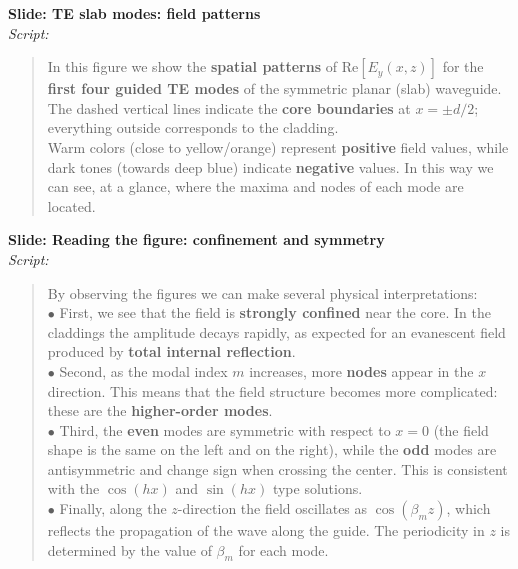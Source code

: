 \documentclass{article}
\begin{document}
\vspace{0.4cm}

\noindent
\textbf{Slide: TE slab modes: field patterns}\\[2mm]
\textit{Script:}\\[2mm]

\begin{quote}
In this figure we show the \textbf{spatial patterns} of \(\text{Re}[E_y(x,z)]\) for the 
\textbf{first four guided TE modes} of the symmetric planar (slab) waveguide.\\[2mm]
The dashed vertical lines indicate the \textbf{core boundaries} at \(x = \pm d/2\); 
everything outside corresponds to the cladding.\\[2mm]
Warm colors (close to \textcolor{Sun}{yellow/orange}) represent \textbf{positive} field values, 
while dark tones (towards \textcolor{trueblue}{deep blue}) indicate \textbf{negative} values. 
In this way we can see, at a glance, where the maxima and nodes of each mode are located.
\end{quote}

\vspace{0.4cm}

\noindent
\textbf{Slide: Reading the figure: confinement and symmetry}\\[2mm]
\textit{Script:}\\[2mm]

\begin{quote}
By observing the figures we can make several physical interpretations:\\[2mm]
\(\bullet\) First, we see that the field is \textbf{strongly confined} near the core. 
In the claddings the amplitude decays rapidly, as expected for an evanescent field produced by 
\textbf{total internal reflection}.\\[2mm]
\(\bullet\) Second, as the modal index \(m\) increases, more \textbf{nodes} appear in the \(x\) 
direction. This means that the field structure becomes more complicated: these are the 
\textbf{higher-order modes}.\\[2mm]
\(\bullet\) Third, the \textbf{even} modes are symmetric with respect to \(x=0\) (the field shape is 
the same on the left and on the right), while the \textbf{odd} modes are antisymmetric and change 
sign when crossing the center. This is consistent with the \(\cos(hx)\) and \(\sin(hx)\) type 
solutions.\\[2mm]
\(\bullet\) Finally, along the \(z\)-direction the field oscillates as \(\cos(\beta_m z)\), which 
reflects the propagation of the wave along the guide. The periodicity in \(z\) is determined by 
the value of \(\beta_m\) for each mode.
\end{quote}
\end{document}
